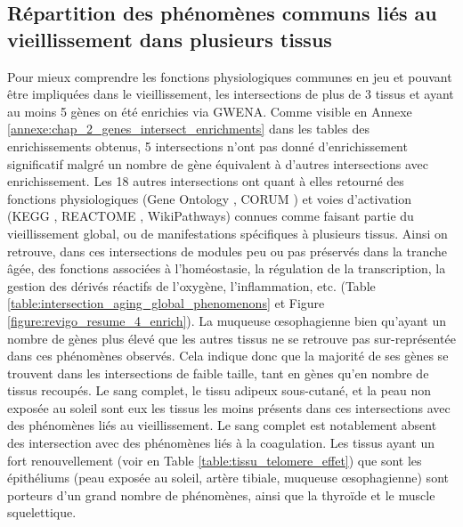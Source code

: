 \subsection{Répartition des phénomènes communs liés au vieillissement dans plusieurs tissus}

Pour mieux comprendre les fonctions physiologiques communes en jeu et pouvant être impliquées dans le vieillissement, les intersections de plus de 3 tissus et ayant au moins 5 gènes on été enrichies via GWENA. Comme visible en Annexe \ref{annexe:chap_2_genes_intersect_enrichments} dans les tables des enrichissements obtenus, 5 intersections n'ont pas donné d'enrichissement significatif malgré un nombre de gène équivalent à d'autres intersections avec enrichissement. Les 18 autres intersections ont quant à elles retourné des fonctions physiologiques (Gene Ontology \cite{Ashburner2000}, CORUM \cite{Ruepp2008}) et voies d'activation (KEGG \cite{Kanehisa2019}, REACTOME \cite{Fabregat2016}, WikiPathways\cite{Slenter2018}) connues comme faisant partie du vieillissement global, ou de manifestations spécifiques à plusieurs tissus. Ainsi on retrouve, dans ces intersections de modules peu ou pas préservés dans la tranche âgée, des fonctions associées à l'homéostasie, la régulation de la transcription, la gestion des dérivés réactifs de l'oxygène, l'inflammation, etc. (Table \ref{table:intersection_aging_global_phenomenons} et Figure \ref{figure:revigo_resume_4_enrich}). La muqueuse œsophagienne bien qu'ayant un nombre de gènes plus élevé que les autres tissus ne se retrouve pas sur-représentée dans ces phénomènes observés. Cela indique donc que la majorité de ses gènes se trouvent dans les intersections de faible taille, tant en gènes qu'en nombre de tissus recoupés. Le sang complet, le tissu adipeux sous-cutané, et la peau non exposée au soleil sont eux les tissus les moins présents dans ces intersections avec des phénomènes liés au vieillissement. Le sang complet est notablement absent des intersection avec des phénomènes liés à la coagulation. Les tissus ayant un fort renouvellement (voir en Table \ref{table:tissu_telomere_effet}) que sont les épithéliums (peau exposée au soleil, artère tibiale, muqueuse œsophagienne) sont porteurs d'un grand nombre de phénomènes, ainsi que la thyroïde et le muscle squelettique. 


